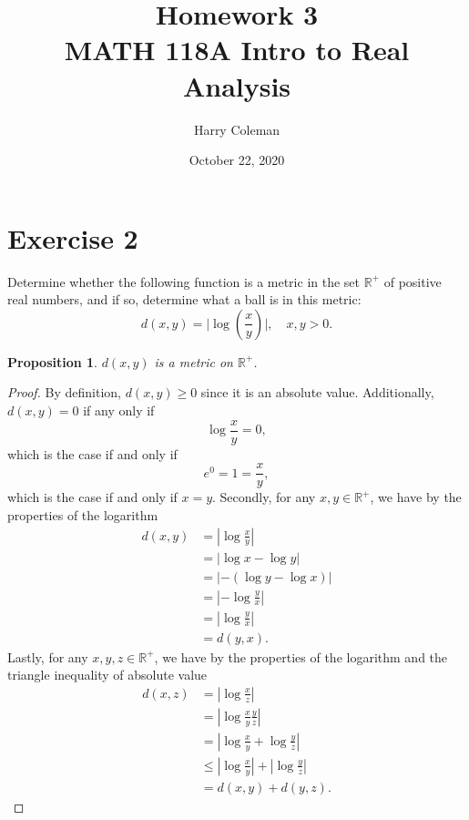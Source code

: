 \documentclass[12pt]{article}
\newtheorem{proposition}{Proposition}
\newenvironment{problem}
    {\begin{lrbox}{\mybox}\begin{minipage}{\textwidth-10pt}}
    {\end{minipage}\end{lrbox}\framebox[6.5in]{\usebox{\mybox}}}
\newcommand{\R}{\mathbb{R}}
\begin{document}
 
\title{Homework 3\\
    \large MATH 118A Intro to Real Analysis
}
\author{Harry Coleman}
\date{October 22, 2020}
\maketitle

 \section*{Exercise 2}
\begin{problem}
    Determine whether the following function is a metric in the set $\mathbb{R}^+$ of positive real numbers, and if so, determine what a ball is in this metric: 
    \begin{equation}
    d(x,y) = \Big |\log\left ( \frac{x}{y} \right ) \Big |,\quad x,y>0.
    \end{equation}
\end{problem}

\begin{proposition}
    $d(x,y)$ is a metric on $\R^+$.
\end{proposition}

\begin{proof}
    By definition, $d(x,y)\geq 0$ since it is an absolute value. Additionally, $d(x,y)=0$ if any only if
    \[\log \frac xy = 0,\]
    which is the case if and only if
    \[e^0 = 1 = \frac xy,\]
    which is the case if and only if $x=y$. Secondly, for any $x,y\in\R^+$, we have by the properties of the logarithm
    \begin{align*}
        d(x,y)
            &= \left|\log\frac xy\right| \\
            &= \left|\log x - \log y\right| \\
            &= \left|-(\log y - \log x)\right| \\
            &= \left|-\log \frac yx\right| \\
            &= \left|\log \frac yx\right| \\
            &= d(y,x).
    \end{align*}
    Lastly, for any $x,y,z\in\R^+$, we have by the properties of the logarithm and the triangle inequality of absolute value
    \begin{align*}
        d(x,z)
            &= \left|\log\frac xz\right| \\
            &= \left|\log\frac xy\frac yz\right| \\
            &= \left|\log\frac xy + \log\frac yz\right| \\
            &\leq \left|\log\frac xy\right| + \left|\log\frac yz\right| \\
            &= d(x,y) + d(y,z).
    \end{align*}
    
\end{proof}
\end{document}
